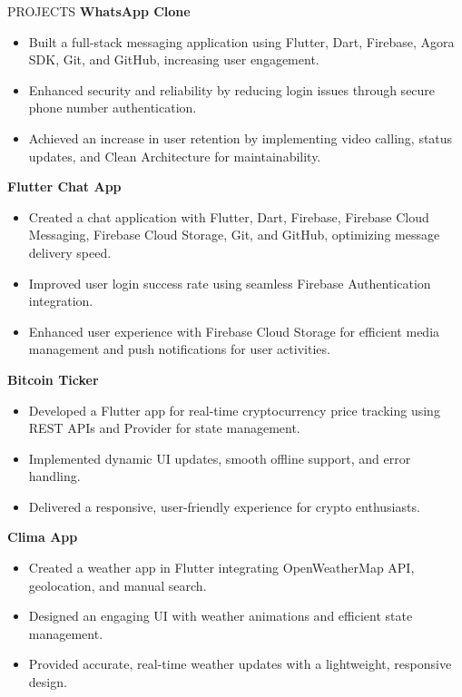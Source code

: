 \documentclass{resume}
\begin{document}
\begin{rSection}{PROJECTS}
\textbf{WhatsApp Clone} \hfill {}
\begin{itemize}
\item Built a full-stack messaging application using Flutter, Dart, Firebase, Agora SDK, Git, and GitHub, increasing user engagement.
\item Enhanced security and reliability by reducing login issues through secure phone number authentication.
\item Achieved an increase in user retention by implementing video calling, status updates, and Clean Architecture for maintainability.
\end{itemize}

\textbf{Flutter Chat App} \hfill {}
\begin{itemize}
\item Created a chat application with Flutter, Dart, Firebase, Firebase Cloud Messaging, Firebase Cloud Storage, Git, and GitHub, optimizing message delivery speed.
\item Improved user login success rate using seamless Firebase Authentication integration.
\item Enhanced user experience with Firebase Cloud Storage for efficient media management and push notifications for user activities.
\end{itemize}

\textbf{Bitcoin Ticker} \hfill {}
\begin{itemize}
\item Developed a Flutter app for real-time cryptocurrency price tracking using REST APIs and Provider for state management.
\item Implemented dynamic UI updates, smooth offline support, and error handling.
\item Delivered a responsive, user-friendly experience for crypto enthusiasts.
\end{itemize}

\textbf{Clima App} \hfill {}
\begin{itemize}
\item Created a weather app in Flutter integrating OpenWeatherMap API, geolocation, and manual search.
\item Designed an engaging UI with weather animations and efficient state management.
\item Provided accurate, real-time weather updates with a lightweight, responsive design.
\end{itemize}

\end{rSection}
\end{document}
